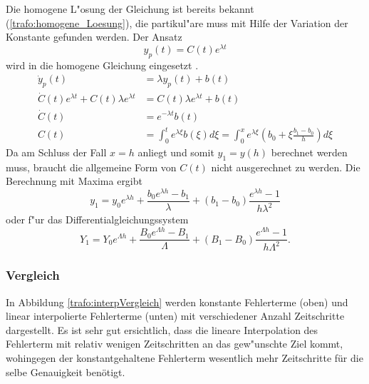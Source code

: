 \begin{refsection}
Die homogene L"osung der Gleichung ist bereits bekannt (\ref{trafo:homogene_Loesung}), die partikul"are muss mit Hilfe der Variation der Konstante gefunden werden. Der Ansatz
\begin{equation*}
	y_p(t) = C(t)e^{\lambda t}
\end{equation*}
wird in die homogene Gleichung eingesetzt \cite{trafo:Mueller}.
\begin{align*}
	\dot{y}_p(t) &= \lambda y_p(t) + b(t) \\
	\dot{C}(t)e^{\lambda t} + C(t)\lambda e^{\lambda t} &= C(t) \lambda e^{\lambda t} + b(t) \\
	\dot{C}(t) &= e^{-\lambda t} b(t) \\
	C(t) &= \int_{0}^{t} e^{\lambda \xi} b(\xi) d\xi = \int_{0}^{x} e^{\lambda \xi} \left(b_0 + \xi \frac{b_1 - b_0}{h}\right) d\xi
\end{align*}
Da am Schluss der Fall $x = h$ anliegt und somit $y_1 = y(h)$ berechnet werden muss, braucht die allgemeine Form von $C(t)$ nicht ausgerechnet zu werden. Die Berechnung mit Maxima ergibt \cite{trafo:Mueller}
\begin{equation}
	y_1 = y_0 e^{\lambda h} + \frac{b_0 e^{\lambda h} - b_1}{\lambda} + \left(b_1 - b_0\right) \frac{e^{\lambda h} -1}{h \lambda^2}
	\label{trafo:linInterp}
\end{equation}
oder f"ur das Differentialgleichungssystem
\begin{equation}
	Y_1 = Y_0 e^{\Lambda h} + \frac{B_0 e^{\Lambda h} - B_1}{\Lambda} + \left(B_1 - B_0\right) \frac{e^{\Lambda h} -1}{h \Lambda^2}.
	\label{trafo:exakteLoesung}
\end{equation}

\subsubsection{Vergleich}
In Abbildung \ref{trafo:interpVergleich} werden konstante Fehlerterme (oben) und linear interpolierte Fehlerterme (unten) mit verschiedener Anzahl Zeitschritte dargestellt. Es ist sehr gut ersichtlich, dass die lineare Interpolation des Fehlerterm mit relativ wenigen Zeitschritten an das gew"unschte Ziel kommt, wohingegen der konstantgehaltene Fehlerterm wesentlich mehr Zeitschritte für die selbe Genauigkeit benötigt. 


\end{refsection}
